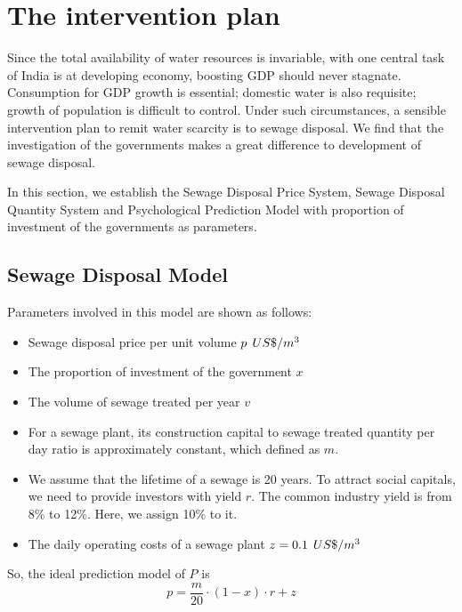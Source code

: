 \documentclass[tcn = 45538, sheet = true, abstract = true]{mcmthesis}
\begin{document}
\section{The intervention plan}

\hspace{1.5 em} Since the total availability of water resources is invariable, 
with one central task of India is at developing economy, 
boosting GDP should never stagnate. 
Consumption for GDP growth is essential; 
domestic water is also requisite; 
growth of population is difficult to control. 
Under such circumstances, 
a sensible intervention plan to remit water scarcity is to sewage disposal. 
We find that the investigation of the governments makes a great difference to development of sewage disposal.

In this section, 
we establish the Sewage Disposal Price System, 
Sewage Disposal Quantity System and Psychological Prediction Model with proportion of investment of the governments as parameters.

\subsection{Sewage Disposal Model}

\hspace{1.5 em} Parameters involved in this model are shown as follows: 

\begin{itemize}
\item Sewage disposal price per unit volume $p\hspace{1 ex}US\$/m^3$
\item The proportion of investment of the government $x$
\item The volume of sewage treated per year $v$
\item For a sewage plant, 
its construction capital to sewage treated quantity per day ratio is approximately constant, 
which defined as $m$. 
\item We assume that the lifetime of a sewage is 20 years. 
To attract social capitals, 
we need to provide investors with yield $r$. 
The common industry yield is from 8\% to 12\%. 
Here, 
we assign 10\% to it.
\item The daily operating costs of a sewage plant $z = 0.1\hspace{1 ex}US\$/m^3$
\end{itemize}

So, 
the ideal prediction model of $P$ is
\begin{equation}
p = \frac{m}{20} \cdot (1 - x) \cdot r + z
\end{equation}
\end{document}
